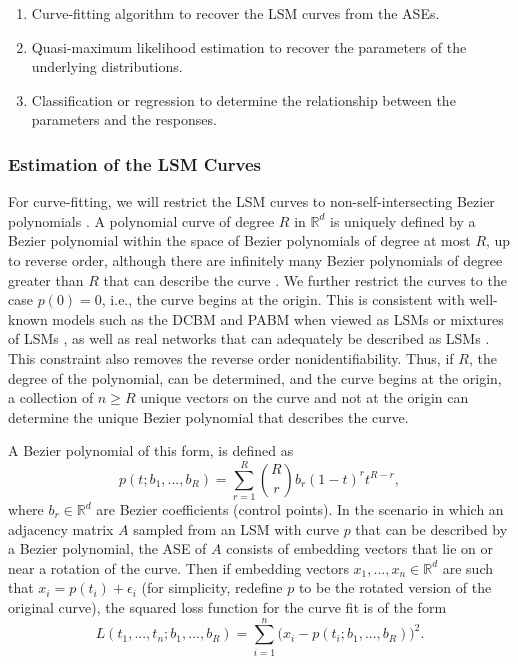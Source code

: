 \documentclass[12pt]{article}
\providecommand{\tightlist}{%
  \setlength{\itemsep}{0pt}\setlength{\parskip}{0pt}}
\begin{document}
\begin{enumerate}
\def\labelenumi{\arabic{enumi}.}
\tightlist
\item
  Curve-fitting algorithm to recover the LSM curves from the ASEs.
\item
  Quasi-maximum likelihood estimation to recover the parameters of the
  underlying distributions.
\item
  Classification or regression to determine the relationship between the
  parameters and the responses.
\end{enumerate}

\subsubsection{Estimation of the LSM
Curves}\label{estimation-of-the-lsm-curves}

For curve-fitting, we will restrict the LSM curves to
non-self-intersecting Bezier polynomials \citep{10.5555/320367}. A
polynomial curve of degree \(R\) in \(\mathbb{R}^d\) is uniquely defined
by a Bezier polynomial within the space of Bezier polynomials of degree
at most \(R\), up to reverse order, although there are infinitely many
Bezier polynomials of degree greater than \(R\) that can describe the
curve \citep{SANCHEZREYES2022102118}. We further restrict the curves to
the case \(p(0) = 0\), i.e., the curve begins at the origin. This is
consistent with well-known models such as the DCBM and PABM when viewed
as LSMs or mixtures of LSMs
\citep{Koo_2022, rubindelanchy2017statistical}, as well as real networks
that can adequately be described as LSMs \citep{athreya2020estimation}.
This constraint also removes the reverse order nonidentifiability. Thus,
if \(R\), the degree of the polynomial, can be determined, and the curve
begins at the origin, a collection of \(n \geq R\) unique vectors on the
curve and not at the origin can determine the unique Bezier polynomial
that describes the curve.

A Bezier polynomial of this form, is defined as \begin{equation}
\label{eq:bezier}
p(t; b_1, ..., b_R) = \sum_{r=1}^R \binom{R}{r} b_r (1-t)^r t^{R-r},
\end{equation} where \(b_r \in \mathbb{R}^d\) are Bezier coefficients
(control points). In the scenario in which an adjacency matrix \(A\)
sampled from an LSM with curve \(p\) that can be described by a Bezier
polynomial, the ASE of \(A\) consists of embedding vectors that lie on
or near a rotation of the curve. Then if embedding vectors
\(x_1, ..., x_n \in \mathbb{R}^d\) are such that
\(x_i = p(t_i) + \epsilon_i\) (for simplicity, redefine \(p\) to be the
rotated version of the original curve), the squared loss function for
the curve fit is of the form \begin{equation}
\label{eq:bezier-loss-full}
L(t_1, ..., t_n; b_1, ..., b_R) = \sum_{i=1}^n \big( x_i - p(t_i; b_1, ..., b_R) \big)^2.
\end{equation}
\end{document}
